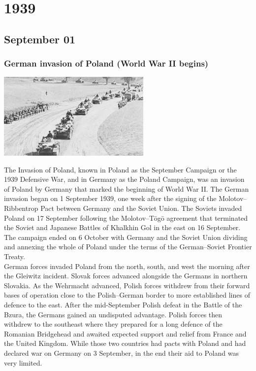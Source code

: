 \documentclass[11pt]{report}
\begin{document}
\chapter{1939}
\section{September 01}
\subsection{German invasion of Poland (World War II begins)}
\vspace{2mm}\begin{center}\includegraphics[width=7.5cm]{./img/gerInvadesPol.jpg}\end{center}
The Invasion of Poland, known in Poland as the September Campaign or the 1939 Defensive War, and in Germany as the Poland Campaign, was an invasion of Poland by Germany that marked the beginning of World War II. The German invasion began on 1 September 1939, one week after the signing of the Molotov–Ribbentrop Pact between Germany and the Soviet Union. The Soviets invaded Poland on 17 September following the Molotov–Tōgō agreement that terminated the Soviet and Japanese Battles of Khalkhin Gol in the east on 16 September. The campaign ended on 6 October with Germany and the Soviet Union dividing and annexing the whole of Poland under the terms of the German–Soviet Frontier Treaty.\\
\indent German forces invaded Poland from the north, south, and west the morning after the Gleiwitz incident. Slovak forces advanced alongside the Germans in northern Slovakia. As the Wehrmacht advanced, Polish forces withdrew from their forward bases of operation close to the Polish–German border to more established lines of defence to the east. After the mid-September Polish defeat in the Battle of the Bzura, the Germans gained an undisputed advantage. Polish forces then withdrew to the southeast where they prepared for a long defence of the Romanian Bridgehead and awaited expected support and relief from France and the United Kingdom. While those two countries had pacts with Poland and had declared war on Germany on 3 September, in the end their aid to Poland was very limited.
\end{document}
